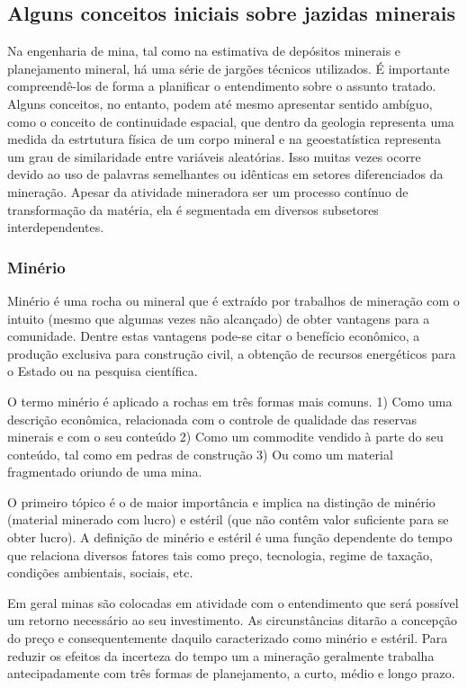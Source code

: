  \subsection{Alguns conceitos iniciais sobre jazidas minerais}
 
 Na engenharia de mina, tal como na estimativa de depósitos minerais e planejamento mineral, há uma série de jargões técnicos utilizados. É importante compreendê-los de forma a planificar o entendimento sobre o assunto tratado. Alguns conceitos, no entanto, podem até mesmo apresentar sentido ambíguo, como o conceito de continuidade espacial, que dentro da geologia representa uma medida da estrtutura física de um corpo mineral e na geoestatística representa um grau de similaridade entre variáveis aleatórias. Isso muitas vezes ocorre devido ao uso de palavras semelhantes ou idênticas em setores diferenciados da mineração. Apesar da atividade mineradora ser um processo contínuo de transformação da matéria, ela é segmentada em diversos subsetores interdependentes.  
 
\subsubsection{Minério} 

Minério é uma rocha ou mineral que é extraído por trabalhos de mineração com o intuito (mesmo que algumas vezes não alcançado) de obter vantagens para a comunidade. Dentre estas vantagens pode-se citar o benefício econômico, a produção exclusiva para construção civil, a obtenção de recursos energéticos para o Estado ou na pesquisa científica.

O termo minério é aplicado a rochas em três formas mais comuns. 1) Como uma descrição econômica, relacionada com o controle de qualidade das reservas minerais e com o seu conteúdo 2) Como um commodite vendido à parte do seu conteúdo, tal como em pedras de construção 3) Ou como um material fragmentado oriundo de uma mina. 

O primeiro tópico é o de  maior importância e implica na distinção de minério (material minerado com lucro) e estéril (que não contêm valor suficiente para se obter lucro). A definição de minério e estéril é uma função dependente do tempo que relaciona diversos fatores tais como preço, tecnologia, regime de taxação, condições ambientais, sociais, etc. 

Em geral minas são colocadas em atividade com o entendimento que será possível um retorno necessário ao seu investimento. As circunstâncias ditarão a concepção do preço e consequentemente daquilo caracterizado como minério e estéril. Para reduzir os efeitos da incerteza do tempo um a mineração geralmente trabalha antecipadamente com três formas de planejamento, a curto, médio e longo prazo. 

